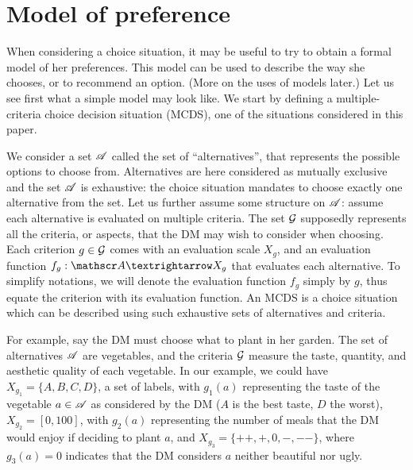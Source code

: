 \documentclass[french, english]{llncs}
\begin{document}
\section{Model of preference}
When considering a choice situation, it may be useful to try to obtain a formal model of her preferences. This model can be used to describe the way she chooses, or to recommend an option. (More on the uses of models later.) Let us see first what a simple model may look like. We start by defining a multiple-criteria choice decision situation (MCDS), one of the situations considered in this paper.

We consider a set $\mathscr{A}$ called the set of “alternatives”, that represents the possible options to choose from. Alternatives are here considered as mutually exclusive and the set $\mathscr{A}$ is exhaustive: the choice situation mandates to choose exactly one alternative from the set. Let us further assume some structure on $\mathscr{A}$: assume each alternative is evaluated on multiple criteria. The set $\mathcal{G}$ supposedly represents all the criteria, or aspects, that the \ac{DM} may wish to consider when choosing. Each criterion $g \in \mathcal{G}$ comes with an evaluation scale $X_g$, and an evaluation function $f_g: \allalts → X_g$ that evaluates each alternative. To simplify notations, we will denote the evaluation function $f_g$ simply by $g$, thus equate the criterion with its evaluation function. An MCDS is a choice situation which can be described using such exhaustive sets of alternatives and criteria. 

For example, say the \ac{DM} must choose what to plant in her garden. The set of alternatives $\mathscr{A}$ are vegetables, and the criteria $\mathcal{G}$ measure the taste, quantity, and aesthetic quality of each vegetable. In our example, we could have $X_{g_1} = \{A, B, C, D\}$, a set of labels, with $g_1(a)$ representing the taste of the vegetable $a \in \mathscr{A}$ as considered by the \ac{DM} ($A$ is the best taste, $D$ the worst), $X_{g_2} = [0, 100]$, with $g_2(a)$ representing the number of meals that the \ac{DM} would enjoy if deciding to plant $a$, and $X_{g_3} = \{++, +, 0, −, −−\}$, where $g_3(a) = 0$ indicates that the \ac{DM} considers $a$ neither beautiful nor ugly.
\end{document}
